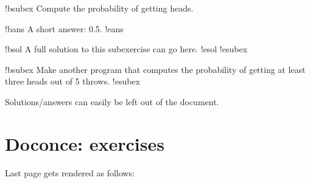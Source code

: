 \documentclass[%
oneside,                 %
final,                   %
chapterprefix=true,      %
open=right               %
10pt]{book}
\begin{document}
!bsubex
Compute the probability of getting heads.

!bans
A short answer: 0.5.
!eans

!bsol
A full solution to this subexercise can go here.
!esol
!esubex

!bsubex
Make another program that computes the probability
of getting at least three heads out of 5 throws.
!esubex
\eccq

Solutions/answers can easily be left out of the document.

\section{Doconce: exercises}

Last page gets rendered as follows:
\end{document}
